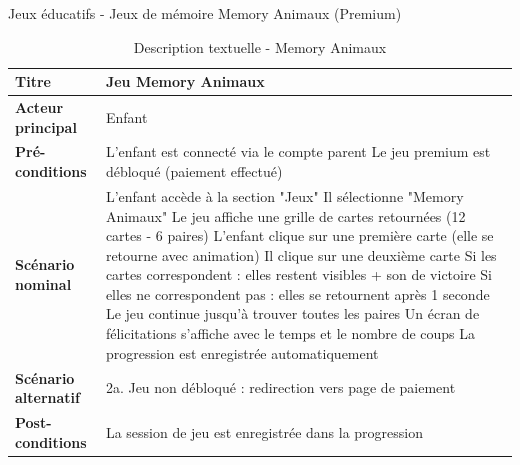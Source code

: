 \documentclass[12pt,a4paper]{report}
\begin{document}
Jeux éducatifs - Jeux de mémoire
Memory Animaux (Premium)
\begin{table}[H]
\centering
\begin{tabular}{|p{4cm}|p{10cm}|}
\hline
\textbf{Titre} & Jeu Memory Animaux \\
\hline
\textbf{Acteur principal} & Enfant \\
\hline
\textbf{Pré-conditions} & 
L'enfant est connecté via le compte parent \newline
Le jeu premium est débloqué (paiement effectué) \\
\hline
\textbf{Scénario nominal} & 
L'enfant accède à la section "Jeux" \newline
Il sélectionne "Memory Animaux" \newline
Le jeu affiche une grille de cartes retournées (12 cartes - 6 paires) \newline
L'enfant clique sur une première carte (elle se retourne avec animation) \newline
Il clique sur une deuxième carte \newline
Si les cartes correspondent : elles restent visibles + son de victoire \newline
Si elles ne correspondent pas : elles se retournent après 1 seconde \newline
Le jeu continue jusqu'à trouver toutes les paires \newline
Un écran de félicitations s'affiche avec le temps et le nombre de coups \newline
La progression est enregistrée automatiquement \\
\hline
\textbf{Scénario alternatif} & 
2a. Jeu non débloqué : redirection vers page de paiement \\
\hline
\textbf{Post-conditions} & La session de jeu est enregistrée dans la progression \\
\hline
\end{tabular}
\caption{Description textuelle - Memory Animaux}
\end{table}

\end{document}
